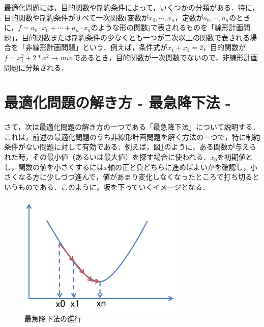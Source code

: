 \documentclass{jarticle}
\begin{document}
最適化問題には，目的関数や制約条件によって，いくつかの分類がある．特に，目的関数や制約条件がすべて一次関数(変数が$x_0,\cdots,x_n$，定数が$a_0,\cdots,a_n$のときに，$f=a_0 \cdot x_0 + \cdots + a_n \cdot x_n$のような形の関数)で表されるものを「線形計画問題」，目的関数または制約条件の少なくとも一つが二次以上の関数で表される場合を「非線形計画問題」という．例えば，条件式が$x_1+x_2=2$，目的関数が$f=x_1^2+2 * x^2 \rightarrow min$であるとき，目的関数が一次関数でないので，非線形計画問題に分類される．

\section{最適化問題の解き方 - 最急降下法 -}
さて，次は最適化問題の解き方の一つである「最急降下法」について説明する．これは，前述の最適化問題のうち非線形計画問題を解く方法の一つで，特に制約条件がない問題に対して有効である．例えば，図\ref{fig:graph}のように，ある関数が与えられた時，その最小値（あるいは最大値）を探す場合に使われる．$x_0$を初期値とし，関数の値を小さくするには$x$軸の正と負どちらに進めばよいかを確認し，小さくなる方に少しづつ進んで，値があまり変化しなくなったところで打ち切るというものである．このように，坂を下っていくイメージとなる．

\begin{figure}[H]
\begin{center}
	\includegraphics[width=80mm]{image/graph.png}
	\caption{最急降下法の進行}
	\label{fig:graph}
\end{center}
\end{figure}

\end{document}
